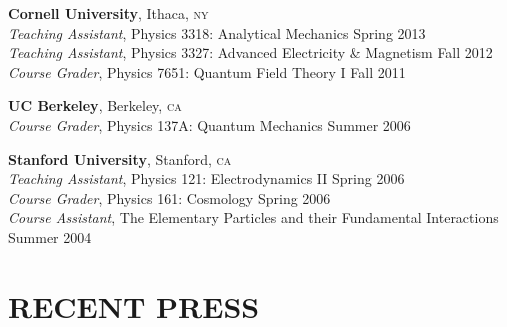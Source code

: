 \documentclass[margin,line]{resume}
\newcommand{\scap}[1]{\textsc{\MakeLowercase{#1}}}
\begin{document}
\begin{resume}
\textbf{Cornell University}, Ithaca, \scap{NY} 
\\
\vspace{0mm}%
%
\textsl{Teaching Assistant}, Physics 3318: Analytical Mechanics 
\hfill {Spring 2013}\\
\vspace{0mm}%
%
\textsl{Teaching Assistant}, Physics 3327: Advanced Electricity \& Magnetism 
\hfill {Fall 2012}\\
\vspace{0mm}%
%
\textsl{Course Grader}, Physics 7651: Quantum Field Theory I 
\hfill {Fall 2011}




\textbf{UC Berkeley}, Berkeley, \scap{CA} 
\\
\vspace{0mm}%
%
\textsl{Course Grader}, Physics 137A: Quantum Mechanics 
\hfill {Summer 2006}



\textbf{Stanford University}, Stanford, \scap{CA} 
\\
\vspace{0mm}%
\textsl{Teaching Assistant}, Physics 121: Electrodynamics II 
\hfill {Spring 2006}\\
%
\textsl{Course Grader}, Physics 161: Cosmology 
\hfill {Spring 2006}\\
%	
\textsl{Course Assistant}, The Elementary Particles and their Fundamental Interactions 
\hfill {Summer 2004}\\
\vspace{-3mm}


 

\section{\footnotesize \sc
\sffamily 
{}RECENT PRESS
}



\end{resume}
\end{document}
